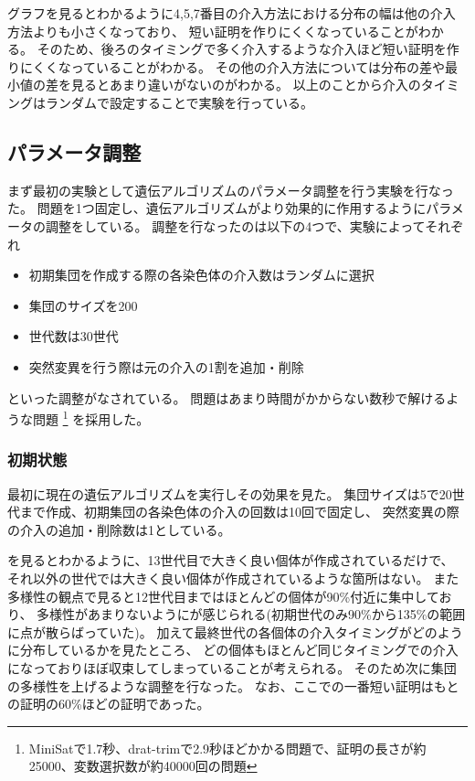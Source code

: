 グラフを見るとわかるように4,5,7番目の介入方法における分布の幅は他の介入方法よりも小さくなっており、
短い証明を作りにくくなっていることがわかる。
そのため、後ろのタイミングで多く介入するような介入ほど短い証明を作りにくくなっていることがわかる。
その他の介入方法については分布の差や最小値の差を見るとあまり違いがないのがわかる。
以上のことから介入のタイミングはランダムで設定することで実験を行っている。






\subsection{パラメータ調整}



まず最初の実験として遺伝アルゴリズムのパラメータ調整を行う実験を行なった。
問題を1つ固定し、遺伝アルゴリズムがより効果的に作用するようにパラメータの調整をしている。
調整を行なったのは以下の4つで、実験によってそれぞれ
\begin{itemize}
    \item 初期集団を作成する際の各染色体の介入数はランダムに選択
    \item 集団のサイズを200
    \item 世代数は30世代
    \item 突然変異を行う際は元の介入の1割を追加・削除
\end{itemize}
といった調整がなされている。
問題はあまり時間がかからない数秒で解けるような問題
\footnote{MiniSatで1.7秒、drat-trimで2.9秒ほどかかる問題で、証明の長さが約25000、変数選択数が約40000回の問題}
を採用した。




\subsubsection{初期状態}

最初に現在の遺伝アルゴリズムを実行しその効果を見た。
集団サイズは5で20世代まで作成、初期集団の各染色体の介入の回数は10回で固定し、
突然変異の際の介入の追加・削除数は1としている。


を見るとわかるように、13世代目で大きく良い個体が作成されているだけで、
それ以外の世代では大きく良い個体が作成されているような箇所はない。
また多様性の観点で見ると12世代目まではほとんどの個体が90\%付近に集中しており、
多様性があまりないようにが感じられる(初期世代のみ90\%から135\%の範囲に点が散らばっていた)。
加えて最終世代の各個体の介入タイミングがどのように分布しているかを見たところ、
どの個体もほとんど同じタイミングでの介入になっておりほぼ収束してしまっていることが考えられる。
そのため次に集団の多様性を上げるような調整を行なった。
なお、ここでの一番短い証明はもとの証明の60\%ほどの証明であった。



